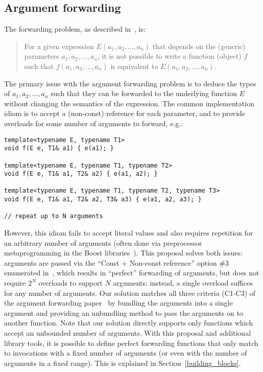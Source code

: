 \documentclass{article}
\begin{document}
\subsection{Argument forwarding}
The forwarding problem, as described in~\cite{Dimov02}, is:

\begin{quote}
  For a given expression $E(a_1, a_2, ..., a_n)$ that depends on the
  (generic) parameters $a_1, a_2, ..., a_n$, it is not possible to
  write a function (object) $f$ such that $f(a_1, a_2, ..., a_n)$ is
  equivalent to $E(a_1, a_2, ..., a_n)$.
\end{quote}

The primary issue with the argument forwarding problem is to deduce
the types of $a_1, a_2, ..., a_n$ such that they can be forwarded to
the underlying function $E$ without changing the semantics of the
expression. The common implementation idiom is to accept a (non-const)
reference for each parameter, and to provide overloads for some number
of arguments to forward, e.g.:
\begin{verbatim}
template<typename E, typename T1>
void f(E e, T1& a1) { e(a1); }

template<typename E, typename T1, typename T2>
void f(E e, T1& a1, T2& a2) { e(a1, a2); }

template<typename E, typename T1, typename T2, typename T3>
void f(E e, T1& a1, T2& a2, T3& a3) { e(a1, a2, a3); }

// repeat up to N arguments
\end{verbatim}

However, this idiom fails to accept literal values and also requires
repetition for an arbitrary number of arguments (often done via
preprocessor metaprogramming in the Boost
libraries~\cite{Preprocessor01}). This proposal solves both issues:
arguments are passed via the ``Const + Non-const reference'' option
\#3 enumerated in~\cite{Dimov02}, which results in ``perfect''
forwarding of arguments, but does not require $2^N$ overloads to
support $N$ arguments: instead, a single overload suffices for any
number of arguments. Our solution matches all three criteria (C1-C3)
of the argument forwarding paper~\cite{Dimov02} by bundling the
arguments into a single argument and providing an unbundling method to
pass the arguments on to another function. Note that our solution
directly supports only functions which accept an unbounded number of
arguments. With this proposal and additional library tools, it is
possible to define perfect forwarding functions that only match to
invocations with a fixed number of arguments (or even with the number
of arguments in a fixed range). This is explained in
Section~\ref{building_blocks}.
\end{document}
